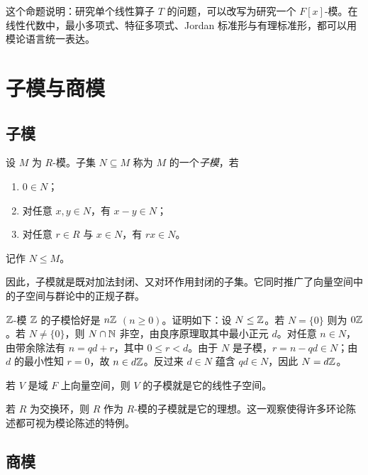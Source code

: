 \begin{remark}
这个命题说明：研究单个线性算子 $T$ 的问题，可以改写为研究一个 $F[x]$-模。在线性代数中，最小多项式、特征多项式、Jordan 标准形与有理标准形，都可以用模论语言统一表达。
\end{remark}

\section{子模与商模}

\subsection{子模}

\begin{definition}
设 $M$ 为 $R$-模。子集 $N\subseteq M$ 称为 $M$ 的一个\emph{子模}，若
\begin{enumerate}[label=(\arabic*)]
  \item $0\in N$；
  \item 对任意 $x,y\in N$，有 $x-y\in N$；
  \item 对任意 $r\in R$ 与 $x\in N$，有 $rx\in N$。
\end{enumerate}
记作 $N\le M$。
\end{definition}

因此，子模就是既对加法封闭、又对环作用封闭的子集。它同时推广了向量空间中的子空间与群论中的正规子群。

\begin{example}
$\mathbb{Z}$-模 $\mathbb{Z}$ 的子模恰好是 $n\mathbb{Z}$ $(n\ge 0)$。证明如下：设 $N\le \mathbb{Z}$。若 $N=\{0\}$ 则为 $0\mathbb{Z}$。若 $N\ne\{0\}$，则 $N\cap \mathbb{N}$ 非空，由良序原理取其中最小正元 $d$。对任意 $n\in N$，由带余除法有 $n=qd+r$，其中 $0\le r<d$。由于 $N$ 是子模，$r=n-qd\in N$；由 $d$ 的最小性知 $r=0$，故 $n\in d\mathbb{Z}$。反过来 $d\in N$ 蕴含 $qd\in N$，因此 $N=d\mathbb{Z}$。
\end{example}

\begin{example}
若 $V$ 是域 $F$ 上向量空间，则 $V$ 的子模就是它的线性子空间。
\end{example}

\begin{example}
若 $R$ 为交换环，则 $R$ 作为 $R$-模的子模就是它的理想。这一观察使得许多环论陈述都可视为模论陈述的特例。
\end{example}

\subsection{商模}

